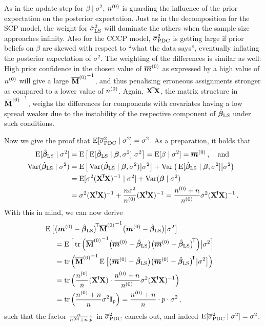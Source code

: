 As in the update step for $\beta\mid\sigma^2$, $n^{(0)}$ is guarding the
influence of the prior expectation on the posterior expectation.
Just as in the decomposition for the SCP model,
the weight for $\hat{\sigma}^2_\text{LS}$ will dominate the others when the sample size approaches infinity.
%
Also for the CCCP model, $\overline{\sigma}^2_\text{PDC}$ %
is getting large if prior beliefs on $\beta$ are skewed with respect to ``what the data says'',
eventually inflating the posterior expectation of $\sigma^2$.
The weighting of the differences is similar as well: High prior confidence
in the chosen value of $\overline{{\bm m}}^{(0)}$ as expressed by a high value of $n^{(0)}$ will
give a large ${\overline{\mathbf{M}}^{(0)}}^{-1}$, and thus penalising erroneous assignments stronger
as compared to a lower value of $n^{(0)}$.
Again, $\mathbf{X}^{{\mbox{\!\scriptsize\textsf{T}}}} \! \mathbf{X}$, the matrix structure in ${\overline{\mathbf{M}}^{(0)}}^{-1}$, weighs the differences
for components with covariates having a low spread weaker
due to the instability of the respective component of $\hat{\boldsymbol{\beta}}_\text{LS}$ under such conditions.

Now we give the proof that $\operatorname{E}[\overline{\sigma}^2_\text{PDC}\mid\sigma^2] = \sigma^2$.
As a preparation, it holds that
\begin{align*}
\E[\bls\mid\sigma^2] &= \E\big[ \E[\bls\mid\bbeta, \sigma^2] \big| \sigma^2 \big]
                      = \E[\beta\mid\sigma^2] = \tmz\,, \quad\text{and} \\
\V(\bls\mid\sigma^2) &= \E\big[ \V(\bls\mid\bbeta, \sigma^2) \big| \sigma^2 \big]
                       +\V\big( \E[\bls\mid\bbeta, \sigma^2] \big| \sigma^2 \big) \\
                     &= \E[\sigma^2 (\XtX)^{-1} \mid\sigma^2]
                       +\V(\bbeta\mid\sigma^2) \\
                     &= \sigma^2 (\XtX)^{-1} + \frac{n\sigma^2}{\nz} (\XtX)^{-1}
                      = \frac{\nz + n}{\nz} \sigma^2 (\XtX)^{-1} \,.
\end{align*}
With this in mind, we can now derive
\begin{align*}
\lefteqn{
\E\big[ \big(\tmz - \bls\big)^\tra {\tMz}^{-1} \big(\tmz - \bls\big) \big| \sigma^2 \big] } \hspace*{3ex} \\
    &= \E\Big[ \tr\Big({\tMz}^{-1} \big(\tmz - \bls\big) \big(\tmz - \bls\big)^\tra \Big) \big| \sigma^2 \Big] \\
    &= \tr\Big( {\tMz}^{-1} \E\big[ \big(\tmz - \bls\big) \big(\tmz - \bls\big)^\tra \big| \sigma^2 \big] \Big) \\
    &= \tr\Big( \frac{\nz}{n}(\XtX) \cdot \frac{\nz + n}{\nz} \sigma^2 (\XtX)^{-1} \Big) \\
    &= \tr\Big( \frac{\nz + n}{n} \sigma^2 \mbf{I}_p \Big) = \frac{\nz + n}{n} \cdot p \cdot \sigma^2 \,,
\end{align*}
such that the factor $\frac{n}{n^{(0)} + n} \frac{1}{p}$ in $\overline{\sigma}^2_\text{PDC}$ cancels out, and indeed $\operatorname{E}[\overline{\sigma}^2_\text{PDC}\mid\sigma^2] = \sigma^2$.


